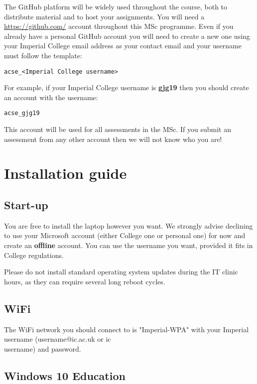 \documentclass[11pt]{article}
\begin{document}
The GitHub platform will be widely used throughout the course, both to distribute material and to host your assignments. You will need a \url{https://github.com/} account throughout this MSc programme. Even if you already have a personal GitHub account you will need to create a new one using your Imperial College email address as your contact email and your username must follow the template:

\begin{verbatim}
acse_<Imperial College username>
\end{verbatim}

For example, if your Imperial College username is \textbf{gjg19} then you should create an account with the username:

\begin{verbatim}
acse_gjg19
\end{verbatim}

This account will be used for all assessments in the MSc. If you submit an assessment from any other account then we will not know who you are!


\section{Installation guide}

\subsection{Start-up}

You are free to install the laptop however you want. We strongly advise declining to use your Microsoft account (either College one or personal one) for now and create an {\bf offline} account. You can use the username you want, provided it fits in College regulations. 

Please do not install standard operating system updates during the IT clinic hours, as they can require several long reboot cycles.

\subsection{WiFi}
The WiFi network you should connect to is "Imperial-WPA" with your Imperial username (username@ic.ac.uk or ic\\username) and password.

\subsection{Windows 10 Education}
\end{document}
